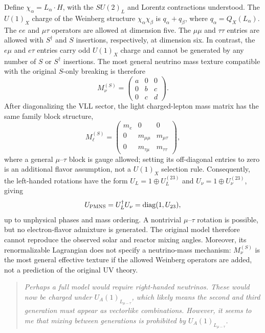 \documentclass[12pt,a4paper]{article}
\begin{document}
Define \(\chi_\alpha=L_\alpha\cdot H\), with the \(SU(2)_L\) and Lorentz contractions understood. The \(U(1)_X\) charge of the Weinberg structure \(\chi_\alpha\chi_\beta\) is \(q_\alpha+q_\beta\), where \(q_\alpha=Q_X(L_\alpha)\). The \(ee\) and \(\mu\tau\) operators are allowed at dimension five. The \(\mu\mu\) and \(\tau\tau\) entries are allowed with \(S^\dagger\) and \(S\) insertions, respectively, at dimension six. In contrast, the \(e\mu\) and \(e\tau\) entries carry odd \(U(1)_X\) charge and cannot be generated by any number of \(S\) or \(S^\dagger\) insertions. The most general neutrino mass texture compatible with the original \(S\)-only breaking is therefore
\[
M_\nu^{(S)}=
\begin{pmatrix}
a&0&0\\
0&b&c\\
0&c&d
\end{pmatrix}.
\]
After diagonalizing the VLL sector, the light charged-lepton mass matrix has the same family block structure,
\[
M_\ell^{(S)}=
\begin{pmatrix}
m_e&0&0\\
0&m_{\mu\mu}&m_{\mu\tau}\\
0&m_{\tau\mu}&m_{\tau\tau}
\end{pmatrix},
\]
where a general \(\mu\)--\(\tau\) block is gauge allowed; setting its off-diagonal entries to zero is an additional flavor assumption, not a \(U(1)_X\) selection rule. Consequently, the left-handed rotations have the form \(U_L=1\oplus U_L^{(23)}\) and \(U_\nu=1\oplus U_\nu^{(23)}\), giving
\[
U_{\rm PMNS}=U_L^\dagger U_\nu
=\operatorname{diag}(1,U_{23}),
\]
up to unphysical phases and mass ordering. A nontrivial \(\mu\)--\(\tau\) rotation is possible, but no electron-flavor admixture is generated. The original model therefore cannot reproduce the observed solar and reactor mixing angles. Moreover, its renormalizable Lagrangian does not specify a neutrino-mass mechanism: \(M_\nu^{(S)}\) is the most general effective texture if the allowed Weinberg operators are added, not a prediction of the original UV theory.

\medskip
{}

\begin{quote}\itshape
Perhaps a full model would require right-handed neutrinos. These would now be charged under \(U_A(1)_{L_{\mu-\tau}}\), which likely means the second and third generation must appear as vectorlike combinations. However, it seems to me that mixing between generations is prohibited by \(U_A(1)_{L_{\mu-\tau}}\).
\end{quote}
\end{document}
